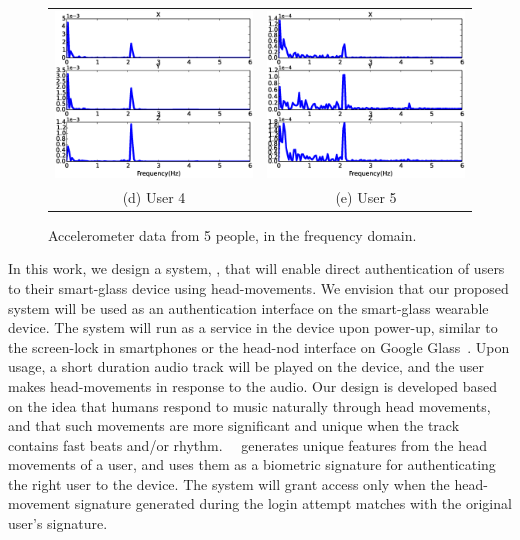 \begin{figure}[t]
\begin{center}
\begin{tabular}{cc}
\includegraphics [width=.35\linewidth]{fig/freq_sub10}&
\includegraphics [width=.35\linewidth]{fig/freq_sub13}\\
(d) User 4& (e) User 5 \\
\end{tabular}
\end{center}
\caption{\label{fig:raw_freq} Accelerometer data from 5 people, in the frequency
domain. }
\end{figure}

In this work, we design a system, \systemname, that will enable direct
authentication of users to their smart-glass device using
head-movements.
We envision that our proposed system will be used as an authentication
interface on the smart-glass wearable device.
The system will run as a service in the device upon power-up,
similar to the screen-lock in smartphones or the head-nod interface on Google
Glass~\cite{googleglass}. Upon usage, a short duration audio track
will be played on the device, and the user makes head-movements in
response to the audio. Our design is developed based on
the idea that humans respond to music naturally through head movements, and that such movements are more
significant and unique when the track contains fast beats and/or rhythm.
~\systemname~generates unique features from the head
movements of a user, and uses them as a biometric signature for
authenticating the right user to the device. The system will
grant access only when the head-movement signature
generated during the login attempt matches with the
original user's signature.

